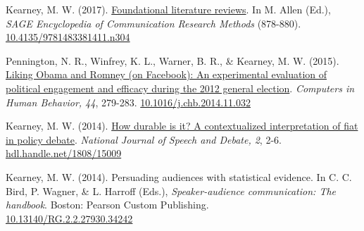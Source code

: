 \begin{bibenum}
\item[] Kearney, M. W. (2017).
\href{http://mikewk.com/flr.pdf}{Foundational literature reviews}.
In M. Allen (Ed.), \textit{SAGE Encyclopedia of Communication Research Methods} (878-880).
\href{http://dx.doi.org/10.4135/9781483381411.n304}{10.4135/9781483381411.n304}

\item Pennington, N. R., Winfrey, K. L., Warner, B. R., \& Kearney, M. W. (2015).
\href{http://www.researchgate.net/publication/269728178_Liking_Obama_and_Romney_(on_Facebook)_An_experimental_evaluation_of_political_engagement_and_efficacy_during_the_2012_general_election}{
  Liking Obama and Romney (on Facebook): An experimental evaluation of political engagement and efficacy during the 2012 general election}.
\textit{Computers in Human Behavior, 44}, 279-283.
\href{https://doi.org/10.1016/j.chb.2014.11.032}{10.1016/j.chb.2014.11.032}

\item Kearney, M. W. (2014). \href{http://ssrn.com/abstract=2618298}{
  How durable is it? A contextualized interpretation of fiat in policy debate}.
\textit{National Journal of Speech and Debate, 2}, 2-6.
\href{http://hdl.handle.net/1808/15009}{hdl.handle.net/1808/15009}

\item[] Kearney, M. W. (2014). Persuading audiences with statistical evidence.
In C. C. Bird, P. Wagner, \& L. Harroff (Eds.), \textit{Speaker-audience communication: The handbook}.
Boston: Pearson Custom Publishing.\\
\href{https://dx.doi.org/10.13140/RG.2.2.27930.34242}{10.13140/RG.2.2.27930.34242}
\end{bibenum}
